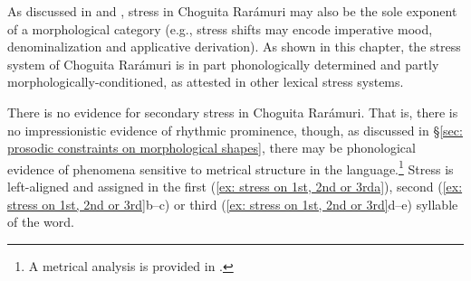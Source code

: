     \medskip
                \medskip
                        \medskip
    \z
\z

As discussed in  and , stress in Choguita Rarámuri may also be the sole exponent of a morphological category (e.g., stress shifts may encode imperative mood, denominalization and applicative derivation). As shown in this chapter, the stress system of Choguita Rarámuri is in part phonologically determined and partly morphologically-conditioned, as attested in other lexical stress systems.

There is no evidence for secondary stress in Choguita Rarámuri. That is, there is no impressionistic evidence of rhythmic prominence, though, as discussed in §\ref{sec: prosodic constraints on morphological shapes}, there may be phonological evidence of phenomena sensitive to metrical structure in the language.\footnote{A metrical analysis is provided in .} Stress is left-aligned and assigned in the first (\ref{ex: stress on 1st, 2nd or 3rda}), second (\ref{ex: stress on 1st, 2nd or 3rd}b--c) or third (\ref{ex: stress on 1st, 2nd or 3rd}d--e) syllable of the word.

